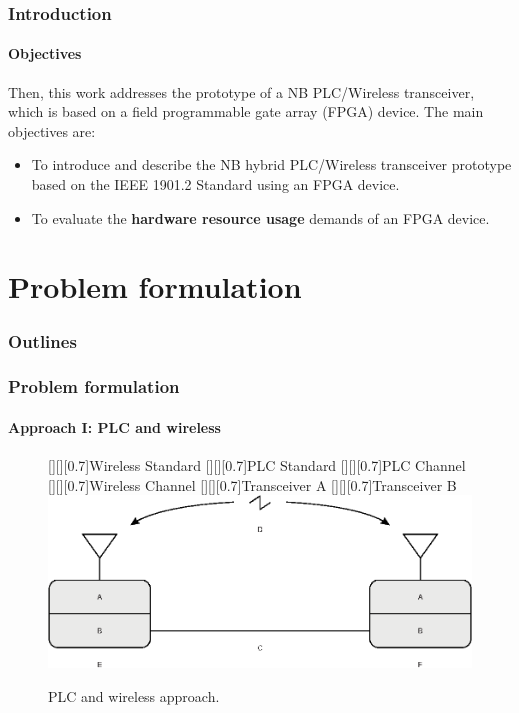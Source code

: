 \documentclass[mathserif]{beamer}
\newcommand{\wait}{\vfill}
\begin{document}
\begin{frame}
	\frametitle{Introduction}
	\framesubtitle{Objectives}
	Then, this work addresses the prototype of a NB PLC/Wireless transceiver, which is based on a field programmable gate array (FPGA) device. The main objectives are: \wait
	\small
	\begin{itemize}
		\item To introduce and describe the NB hybrid PLC/Wireless transceiver prototype based on the IEEE 1901.2 Standard using an FPGA device. \wait
		\item To evaluate the \textbf{hardware resource usage} demands of an FPGA device.
	\end{itemize}
\end{frame}

\section{Problem formulation}
\begin{frame}
	\frametitle{Outlines}
	\small
	\tableofcontents[currentsection]
\end{frame}
	
\newcommand{\sizeLetter}{0.7}
\begin{frame}
	\frametitle{Problem formulation}
	\framesubtitle{Approach I: PLC and wireless}
	\renewcommand{\sizeLetter}{0.7}
	\begin{figure}[ht]
		\centering
		[][][\sizeLetter]{Wireless Standard}
		[][][\sizeLetter]{PLC Standard}
		[][][\sizeLetter]{PLC Channel}
		[][][\sizeLetter]{Wireless Channel}
		[][][\sizeLetter]{Transceiver A}
		[][][\sizeLetter]{Transceiver B}
		\includegraphics[width=\linewidth]{figuras/plc_wl_scheme}
		\caption{PLC and wireless approach.}
		\label{fig:plcwlscheme1}
	\end{figure}
\end{frame}
\end{document}
